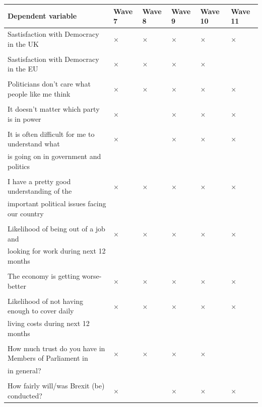 \documentclass[12pt, letter]{article}
\begin{document}
\begin{center}
\scriptsize
\begin{longtable}{llllll}
\toprule[1.5pt]
Dependent variable & Wave 7 & Wave 8 & Wave 9 & Wave 10 & Wave 11 \\ 
\toprule[1pt]
Sastisfaction with Democracy in the UK & $\times$ & $\times$ & $\times$ & $\times$ & $\times$ \\ 
 \\[-4pt]
Sastisfaction with Democracy in the EU & $\times$ & $\times$ & $\times$ & $\times$ &  \\ 
 \\[-4pt]
Politicians don't care what people like me think & $\times$ & $\times$ & $\times$ & $\times$ & $\times$ \\ 
 \\[-4pt]
It doesn't matter which party is in power & $\times$ &  & $\times$ & $\times$ & $\times$ \\ 
 \\[-4pt]
It is often difficult for me to understand what  & $\times$ &  & $\times$ & $\times$ & $\times$ \\
is going on in government and politics &&&&& \\
 \\[-4pt]
I have a pretty good understanding of the & $\times$ & $\times$ & $\times$ & $\times$ & $\times$ \\ 
important political issues facing our country &&&&& \\ 
 \\[-4pt]
Likelihood of being out of a job and & $\times$ & $\times$ & $\times$ & $\times$ & $\times$ \\ 
looking for work during next 12 months &&&&& \\
 \\[-4pt]
The economy is getting worse-better & $\times$ & $\times$ & $\times$ & $\times$ & $\times$ \\ 
 \\[-4pt]
Likelihood of not having enough to cover daily  & $\times$ & $\times$ & $\times$ & $\times$ & $\times$ \\ 
living costs during next 12 months &&&&& \\ 
 \\[-4pt]
How much trust do you have in Members of Parliament in & $\times$ & $\times$ & $\times$ & $\times$ &  \\ 
in general? &&&&& \\
 \\[-4pt]
How fairly will/was Brexit (be) conducted? & $\times$ &  & $\times$ & $\times$ & $\times$ \\ 
\toprule[1.5pt]
\end{longtable}
\end{center}
\end{document}
